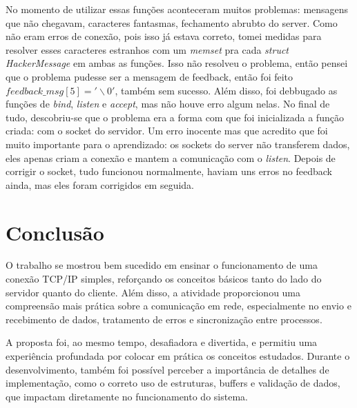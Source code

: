 \documentclass{article}
\begin{document}
        No momento de utilizar essas funções aconteceram muitos problemas: mensagens que não chegavam, caracteres fantasmas, fechamento abrubto do server. Como não eram erros de conexão, pois isso já estava correto, tomei medidas
        para resolver esses caracteres estranhos com um \textit{memset} pra cada \textit{struct HackerMessage} em ambas as funções. Isso não resolveu o problema, então pensei que o problema pudesse ser a mensagem de feedback, então
        foi feito \textit{$feedback\_msg[5] = '\backslash 0'$}, também sem sucesso. Além disso, foi debbugado as funções de \textit{bind}, \textit{listen} e \textit{accept}, mas não houve erro algum nelas. No final de tudo, descobriu-se que o problema era a forma com que foi inicializada a função criada: com o socket do servidor. Um erro inocente mas que acredito que 
        foi muito importante para o aprendizado: os sockets do server não transferem dados, eles apenas criam a conexão e mantem a comunicação com o \textit{listen}. Depois de corrigir o socket, tudo funcionou normalmente, haviam uns erros
        no feedback ainda, mas eles foram corrigidos em seguida.

    \section{Conclusão}

    \hspace{0.5cm}O trabalho se mostrou bem sucedido em ensinar o funcionamento de uma conexão TCP/IP simples, reforçando os conceitos básicos tanto do lado do servidor quanto do cliente. Além disso, a atividade proporcionou uma compreensão mais 
    prática sobre a comunicação em rede, especialmente no envio e recebimento de dados, tratamento de erros e sincronização entre processos. 

    A proposta foi, ao mesmo tempo, desafiadora e divertida, e permitiu uma experiência profundada por colocar em prática os conceitos estudados. Durante o desenvolvimento, também foi possível perceber a importância de detalhes de 
    implementação, como o correto uso de estruturas, buffers e validação de dados, que impactam diretamente no funcionamento do sistema.
\end{document}
